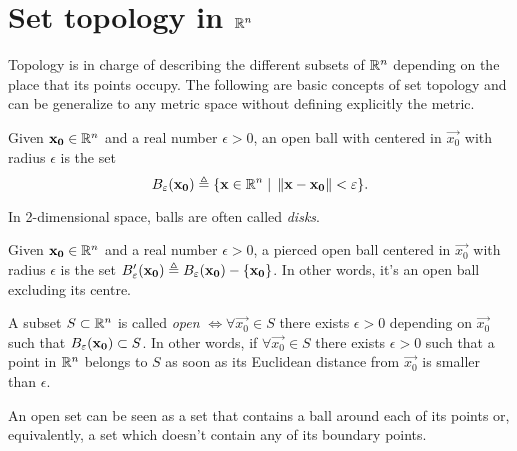 
\section{Set topology in $\Rtn$}

Topology is in charge of describing the different subsets of $\Rtn$ depending on the place that its points occupy. The
following are basic concepts of set topology and can be generalize to any metric space without defining explicitly the metric.

\begin{defn}
Given $\vec{x_0}\in\Rtn$ and a real number $\epsilon > 0$, an open ball with centered in $\vec{x_0}$ with radius $\epsilon$ is the set
\begin{equation}
B_\epsilon\argopen(\vec{x_0}\argclose)\bydef\{\vec{x}\in\Rtn\st\vnorm{\vec{x} - \vec{x_0}} < \epsilon\}.
\end{equation}
\end{defn}

\begin{note}
	In 2-dimensional space, balls are often called \textit{disks}.
\end{note}

\begin{defn}
Given $\vec{x_0}\in\Rtn$ and a real number $\epsilon > 0$, a pierced open ball centered in $\vec{x_0}$ with radius $\epsilon$ is the
set $B'_\epsilon\argopen(\vec{x_0}\argclose)\bydef B_\epsilon\argopen(\vec{x_0}\argclose) - \{\vec{x_0}\}$. In other words, it's an 
open ball excluding its centre.
\end{defn}

\begin{defn}
	A subset $S\subset\Rtn$ is called \textit{open} $\iff\forall\vec{x_0}\in S$ there exists $\epsilon > 0$ depending on $\vec{x_0}$ such that $B_\epsilon\argopen(\vec{x_0}\argclose)\subset S$. In other words, if $\forall\vec{x_0}\in S$ there exists $\epsilon > 0$
	such that a point in $\Rtn$ belongs to $S$ as soon as its Euclidean distance from $\vec{x_0}$ is smaller than $\epsilon$. 
\end{defn}

\begin{note}
An open set can be seen as a set that contains a ball around each of its points or, equivalently, a set which doesn't contain any of
its boundary points.
\end{note}

